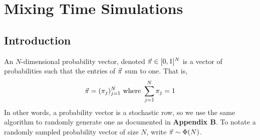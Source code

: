 \chapter{Mixing Time Simulations}
\section{Introduction}


%


\begin{definition}
An $N$-dimensional probability vector, denoted $\vec{\pi} \in [0,1]^N$ is a vector of probabilities such that the entries of $\vec{\pi}$ sum to one. That is,
$$\vec{\pi} = (\pi_j)_{j = 1}^N \text{ where } \sum_{j = 1}^N \pi_j = 1$$
In other words, a probability vector is a stochastic row, so we use the same algorithm to randomly generate one as documented in \textbf{Appendix B}.
To notate a randomly sampled probability vector of size $N$, write $\vec{\pi} \sim \Phi(N)$.

\end{definition}


